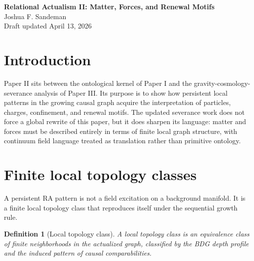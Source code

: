 \documentclass[11pt]{article}
\newtheorem{definition}{Definition}
\begin{document}
\begin{center}
{\LARGE \textbf{Relational Actualism II: Matter, Forces, and Renewal Motifs}}\\[0.75em]
{\large Joshua F. Sandeman}\\[0.25em]
{\normalsize Draft updated April 13, 2026}
\end{center}

\begin{abstract}
This second paper develops the particle, force, and motif structure of Relational Actualism from the BDG-filtered causal graph. The present revision updates the paper where the new finitary and severance results matter. The main additions are: (i) an explicit finite-state interpretation of motif renewal and confinement, (ii) a clarification that the relevant particle and interaction classes are properties of finite local topology classes rather than continuum fields, and (iii) a revised bridge to the severance programme in which boundary counting and hidden causal channels are treated as graph-theoretic observables rather than continuum imports.
\end{abstract}

\section{Introduction}
Paper II sits between the ontological kernel of Paper I and the gravity-cosmology-severance analysis of Paper III. Its purpose is to show how persistent local patterns in the growing causal graph acquire the interpretation of particles, charges, confinement, and renewal motifs. The updated severance work does not force a global rewrite of this paper, but it does sharpen its language: matter and forces must be described entirely in terms of finite local graph structure, with continuum field language treated as translation rather than primitive ontology.

\section{Finite local topology classes}
A persistent RA pattern is not a field excitation on a background manifold. It is a finite local topology class that reproduces itself under the sequential growth rule.

\begin{definition}[Local topology class]
A local topology class is an equivalence class of finite neighborhoods in the actualized graph, classified by the BDG depth profile and the induced pattern of causal comparabilities.
\end{definition}
\end{document}
